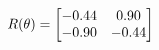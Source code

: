 \documentclass[preview]{standalone}
\begin{document}
\begin{align*}
\special{dvisvgm:raw <g id='unique000'>}R(\theta) = \begin{bmatrix}-0.44 & 0.90\\-0.90 & -0.44\end{bmatrix}\special{dvisvgm:raw </g>}
\end{align*}
\end{document}
